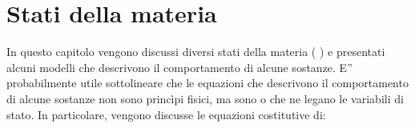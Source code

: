 \documentclass[letterpaper,10pt,italian]{jupyterBook}
\begin{document}
\sphinxstepscope


\chapter{Stati della materia}
\label{\detokenize{ch/thermodynamics/matter:stati-della-materia}}\label{\detokenize{ch/thermodynamics/matter:physics-hs-thermodynamics-matter}}\label{\detokenize{ch/thermodynamics/matter::doc}}
\sphinxAtStartPar
In questo capitolo vengono discussi diversi stati della materia ( ) e presentati alcuni modelli che descrivono il comportamento di alcune sostanze.
E” probabilmente utile sottolineare che le equazioni che descrivono il comportamento di alcune sostanze non sono princìpi fisici, ma sono  o  che ne legano le variabili di stato. In particolare, vengono discusse le equazioni costitutive di:
\end{document}
